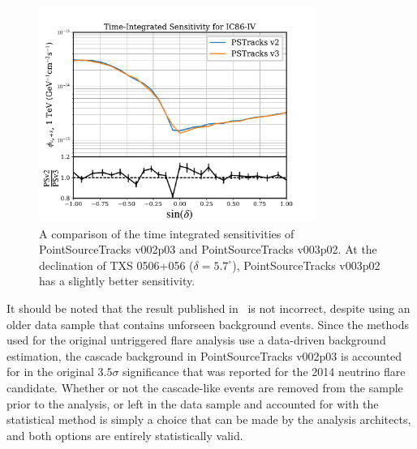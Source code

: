 \begin{figure}[h]
\centering
\includegraphics[width=0.8\textwidth]{figs/v2v3_senscompare.pdf}
\caption{A comparison of the time integrated sensitivities of PointSourceTracks v002p03 and PointSourceTracks v003p02. At the declination of TXS 0506+056 ($\delta=5.7^{\circ}$), PointSourceTracks v003p02 has a slightly better sensitivity. }
\label{fig:senscompare}
\end{figure}

It should be noted that the result published in~\cite{TXS_Archival} is not incorrect, despite using an older data sample that contains unforseen background events. Since the methods used for the original untriggered flare analysis use a data-driven background estimation, the cascade background in PointSourceTracks v002p03 is accounted for in the original $3.5 \sigma$ significance that was reported for the 2014 neutrino flare candidate. Whether or not the cascade-like events are removed from the sample prior to the analysis, or left in the data sample and accounted for with the statistical method is simply a choice that can be made by the analysis architects, and both options are entirely statistically valid. 

